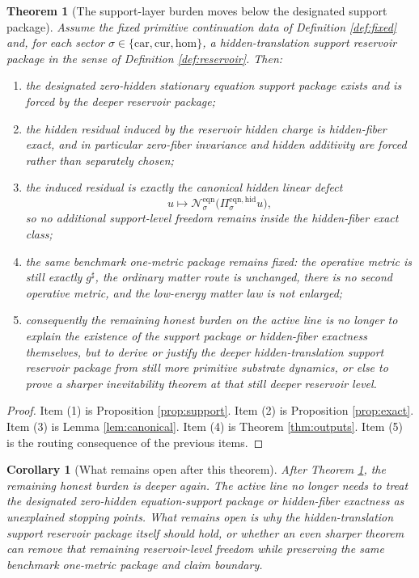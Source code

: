 \documentclass[11pt]{article}
\newcommand{\CompletedMetric}{g^{\sharp}}
\newcommand{\Car}{\mathrm{car}}
\newcommand{\Cur}{\mathrm{cur}}
\newcommand{\Hom}{\mathrm{hom}}
\newcommand{\EqnProj}[1]{\Pi_{#1}^{\mathrm{eqn,hid}}}
\newcommand{\EqnLin}[1]{\mathcal N_{#1}^{\mathrm{eqn}}}
\newtheorem{corollary}{Corollary}
\newtheorem{theorem}{Theorem}
\begin{document}
\begin{theorem}[The support-layer burden moves below the designated support package]
\label{thm:main}
Assume the fixed primitive continuation data of Definition \ref{def:fixed} and, for each sector \(\sigma\in\{\Car,\Cur,\Hom\}\), a hidden-translation support reservoir package in the sense of Definition \ref{def:reservoir}. Then:
\begin{enumerate}
    \item the designated zero-hidden stationary equation support package exists and is forced by the deeper reservoir package;
    \item the hidden residual induced by the reservoir hidden charge is hidden-fiber exact, and in particular zero-fiber invariance and hidden additivity are forced rather than separately chosen;
    \item the induced residual is exactly the canonical hidden linear defect
    \[
    u\mapsto \EqnLin{\sigma}\bigl(\EqnProj{\sigma}u\bigr),
    \]
    so no additional support-level freedom remains inside the hidden-fiber exact class;
    \item the same benchmark one-metric package remains fixed: the operative metric is still exactly \(\CompletedMetric\), the ordinary matter route is unchanged, there is no second operative metric, and the low-energy matter law is not enlarged;
    \item consequently the remaining honest burden on the active line is no longer to explain the existence of the support package or hidden-fiber exactness themselves, but to derive or justify the deeper hidden-translation support reservoir package from still more primitive substrate dynamics, or else to prove a sharper inevitability theorem at that still deeper reservoir level.
\end{enumerate}
\end{theorem}

\begin{proof}
Item (1) is Proposition \ref{prop:support}. Item (2) is Proposition \ref{prop:exact}. Item (3) is Lemma \ref{lem:canonical}. Item (4) is Theorem \ref{thm:outputs}. Item (5) is the routing consequence of the previous items.
\end{proof}

\begin{corollary}[What remains open after this theorem]
\label{cor:next}
After Theorem \ref{thm:main}, the remaining honest burden is deeper again. The active line no longer needs to treat the designated zero-hidden equation-support package or hidden-fiber exactness as unexplained stopping points. What remains open is why the hidden-translation support reservoir package itself should hold, or whether an even sharper theorem can remove that remaining reservoir-level freedom while preserving the same benchmark one-metric package and claim boundary.
\end{corollary}
\end{document}
